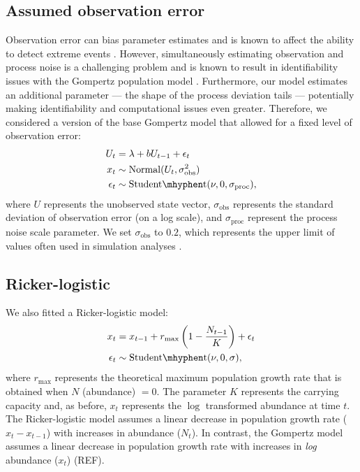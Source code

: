 \subsection{Assumed observation error}

Observation error can bias parameter estimates \citep[e.g.][]{knape2012} and is
known to affect the ability to detect extreme events \citep{ward2007}. However,
simultaneously estimating observation and process noise is a challenging
problem and is known to result in identifiability issues with the Gompertz
population model \citep{knape2008}. Furthermore, our model estimates an
additional parameter --- the shape of the process deviation tails ---
potentially making identifiability and computational issues even greater.
Therefore, we considered a version of the base Gompertz model that allowed for
a fixed level of observation error:
\begin{align*}
U_t &= \lambda + b U_{t-1} + \epsilon_t\\
x_t &\sim \mathrm{Normal}(U_t, \sigma_\mathrm{obs}^2)\\
\epsilon_t &\sim \mathrm{Student\mhyphen t}(\nu, 0, \sigma_\mathrm{proc}),
\end{align*}
where $U$ represents the unobserved state vector, $\sigma_\mathrm{obs}$
represents the standard deviation of observation error (on a log scale), and
$\sigma_\mathrm{proc}$ represent the process noise scale parameter. We set
$\sigma_\mathrm{obs}$ to $0.2$, which represents the upper limit of values often
used in simulation analyses \citep[e.g.][]{valpine2002, thorson2014b}.

\subsection{Ricker-logistic}

We also fitted a Ricker-logistic model:
\begin{align*}
x_t &= x_{t-1} + r_{\mathrm{max}}\left(1 - \frac{N_{t-1}}{K}\right) + \epsilon_t\\
\epsilon_t &\sim \mathrm{Student\mhyphen t}(\nu, 0, \sigma),
\end{align*}
where $r_\mathrm{max}$ represents the theoretical maximum population growth
rate that is obtained when $N$ (abundance) $= 0$. The parameter $K$ represents
the carrying capacity and, as before, $x_t$ represents the $\log$ transformed
abundance at time $t$. The Ricker-logistic model assumes a linear decrease in
population growth rate ($x_t - x_{t-1}$) with increases in abundance ($N_t$).
In contrast, the Gompertz model assumes a linear decrease in population growth
rate with increases in \textit{log} abundance ($x_t$) (REF).

